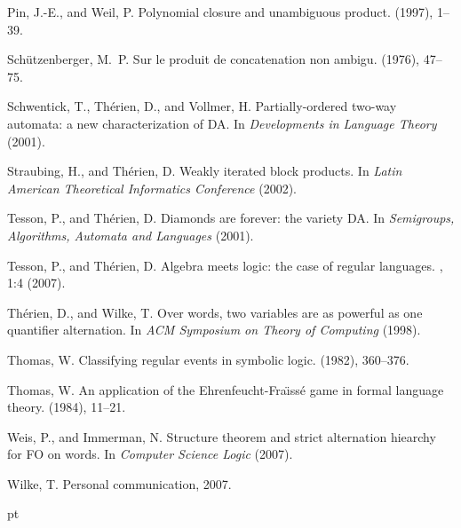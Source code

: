 \documentclass{LMCS}
\begin{document}
\begin{thebibliography}{10}
{\sc Pin, J.-E., and Weil, P.}
\newblock Polynomial closure and unambiguous product.
 (1997), 1--39.

{\sc Sch\"utzenberger, M.~P.}
\newblock Sur le produit de concatenation non ambigu.
 (1976), 47--75.

{\sc Schwentick, T., Th\'erien, D., and Vollmer, H.}
\newblock Partially-ordered two-way automata: a new characterization of {DA}.
\newblock In {\em Developments in {L}anguage {T}heory\/} (2001).

{\sc Straubing, H., and Th\'erien, D.}
\newblock Weakly iterated block products.
\newblock In {\em Latin {A}merican {T}heoretical {I}nformatics {C}onference\/}
  (2002).

{\sc Tesson, P., and Th\'erien, D.}
\newblock Diamonds are forever: the variety {DA}.
\newblock In {\em Semigroups, {A}lgorithms, {A}utomata and {L}anguages\/}
  (2001).

{\sc Tesson, P., and Th\'erien, D.}
\newblock Algebra meets logic: the case of regular languages.
, 1:4 (2007).

{\sc Th\'erien, D., and Wilke, T.}
\newblock Over words, two variables are as powerful as one quantifier
  alternation.
\newblock In {\em A{CM} {S}ymposium on {T}heory of {C}omputing\/} (1998).

{\sc Thomas, W.}
\newblock Classifying regular events in symbolic logic.
 (1982), 360--376.

{\sc Thomas, W.}
\newblock An application of the {E}hrenfeucht-{F}ra\"{\i}ss\'e game in formal
  language theory.
 (1984), 11--21.

{\sc Weis, P., and Immerman, N.}
\newblock Structure theorem and strict alternation hiearchy for {FO} on
  words.
\newblock In {\em Computer {S}cience {L}ogic\/} (2007).

{\sc Wilke, T.}
\newblock Personal communication, 2007.

\end{thebibliography}
 pt
\end{document}
